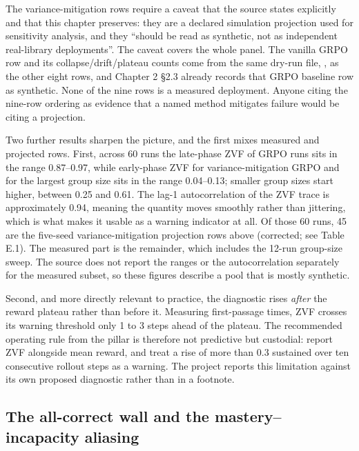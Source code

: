 \documentclass[12pt,a4paper]{report}
\DeclareRobustCommand{\longtok}[1]{\texttt{\seqsplit{#1}}}
\begin{document}
The variance-mitigation rows require a caveat that the source states
explicitly and that this chapter preserves: they are a declared
simulation projection used for sensitivity analysis, and they ``should
be read as synthetic, not as independent real-library deployments''. The
caveat covers the whole panel. The vanilla GRPO row and its
collapse/drift/plateau counts come from the same dry-run file,
\longtok{experiments/results/variance\_mitigation.tsv}, as the other
eight rows, and Chapter 2 §2.3 already records that GRPO baseline row as
synthetic. None of the nine rows is a measured deployment. Anyone citing
the nine-row ordering as evidence that a named method mitigates failure
would be citing a projection.

Two further results sharpen the picture, and the first mixes measured
and projected rows. First, across 60 runs the late-phase ZVF of GRPO
runs sits in the range 0.87--0.97, while early-phase ZVF for
variance-mitigation GRPO and for the largest group size sits in the
range 0.04--0.13; smaller group sizes start higher, between 0.25 and
0.61. The lag-1 autocorrelation of the ZVF trace is approximately 0.94,
meaning the quantity moves smoothly rather than jittering, which is what
makes it usable as a warning indicator at all. Of those 60 runs, 45 are
the five-seed variance-mitigation projection rows above (corrected; see
Table E.1). The measured part is the remainder, which includes the
12-run group-size sweep. The source does not report the ranges or the
autocorrelation separately for the measured subset, so these figures
describe a pool that is mostly synthetic.

Second, and more directly relevant to practice, the diagnostic rises
\emph{after} the reward plateau rather than before it. Measuring
first-passage times, ZVF crosses its warning threshold only 1 to 3 steps
ahead of the plateau. The recommended operating rule from the pillar is
therefore not predictive but custodial: report ZVF alongside mean
reward, and treat a rise of more than 0.3 sustained over ten consecutive
rollout steps as a warning. The project reports this limitation against
its own proposed diagnostic rather than in a footnote.

\subsection{The all-correct wall and the mastery--incapacity
aliasing}\label{the-all-correct-wall-and-the-masteryincapacity-aliasing}
\end{document}
